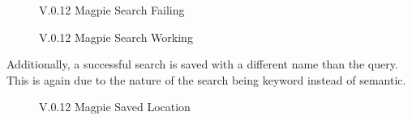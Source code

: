 \begin{figure}[h!]
    \centering
    \caption{V.0.12 Magpie Search Failing}
\end{figure}

\newpage{}
\begin{figure}[h!]
    \centering
    \caption{V.0.12 Magpie Search Working}
\end{figure}

Additionally, a successful search is saved with a different name than the query.
This is again due to the nature of the search being keyword instead of semantic.
\begin{figure}[h!]
    \centering
    \caption{V.0.12 Magpie Saved Location}
\end{figure}

